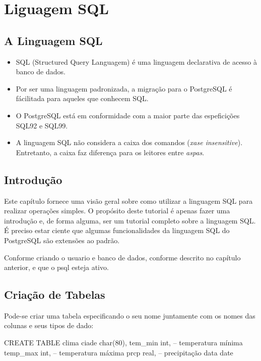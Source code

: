\newpage \chapter{Liguagem SQL}\setcounter{SteP}{1}

\section{A Linguagem SQL}\setcounter{SteP}{1}
\begin{itemize}
	\item{\bf } SQL (Structured Query Languagem) é uma linguagem declarativa de acesso
	à banco de dados.
	\item{\bf }Por ser uma linguagem padronizada, a migração para o PostgreSQL é 
	fácilitada para aqueles que conhecem SQL.
	\item{\bf }O PostgreSQL está em conformidade com a maior parte das espeficições
	SQL92 e SQL99.
	\item{\bf }A linguagem SQL não considera a caixa dos comandos ({\it xase insensitive}).
	Entretanto, a caixa faz diferença para os leitores entre {\it aspas}.
\end{itemize}

\section{Introdução}\setcounter{SteP}{1}
Este capítulo fornece uma visão geral sobre como utilizar a linguagem SQL para realizar operações simples. 
O propósito deste tutorial é apenas fazer uma introdução e, de forma alguma, ser um tutorial completo sobre a linguagem SQL.
É preciso estar ciente que algumas funcionalidades da linguagem SQL do PostgreSQL são extensões ao padrão.

Conforme criando o usuario e banco de dados, conforme descrito no capítulo anterior, e que o 
psql esteja ativo.

\section{Criação de Tabelas}\setcounter{SteP}{1}
Pode-se criar uma tabela especificando o seu nome juntamente com os nomes das colunas e seus tipos de dado:
\begin{BoxVerbatim}
CREATE TABLE clima {
    ciade           char(80),
    tem_min         int,             -- temperatura mínima
    temp_max        int,             -- temperatura máxima
    prcp            real,            -- precipitação
    data            date     
}
\end{BoxVerbatim}
